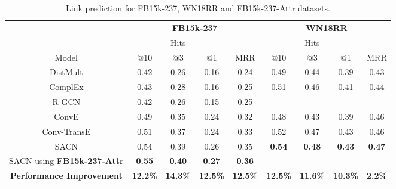 \documentclass[letterpaper]{article} \usepackage{aaai19}  \usepackage{times}  \usepackage{helvet}  \usepackage{courier}  \usepackage{url}  \usepackage{graphicx}  \usepackage{amsmath}
\begin{document}
\begin{table*}
\caption{Link prediction for FB15k-237, WN18RR and FB15k-237-Attr datasets.}
    \bigskip
    \label{tab:table3}
    \tabcolsep=0.32cm
    \centering
    \begin{tabular}{c|c|c|c|c|c|c|c|c}
        \hline
         & \multicolumn{4}{c|}{\textbf{FB15k-237}} & \multicolumn{4}{c}{\textbf{WN18RR}}\\
        \cline{2-9}
         & \multicolumn{3}{c|}{Hits} & \multicolumn{1}{c|}{}  & \multicolumn{3}{c|}{Hits}  & \multicolumn{1}{c}{} \\
        \cline{2-9}
        Model & @10 & @3 & @1 & MRR & @10 & @3 & @1 & MRR  \\
        \hline
        \hline
        DistMult \cite{yang2014distmult}  & 0.42 & 0.26 & 0.16& 0.24  & 0.49 & 0.44 & 0.39 & 0.43  \\
        \hline
        ComplEx \cite{trouillon2016complex}  & 0.43 & 0.28 & 0.16 & 0.25  & 0.51 & 0.46 & 0.41 & 0.44\\
        \hline
        R-GCN \cite{schlichtkrull2018modeling} & 0.42 & 0.26 & 0.15 & 0.25 & --- & ---  & --- & ---  \\
        \hline
        ConvE \cite{dettmers2017conve}  & 0.49 & 0.35 & 0.24 & 0.32   & 0.48 & 0.43 & 0.39 & 0.46 \\
        \hline
        \hline
Conv-TransE & 0.51 & 0.37 & 0.24 & 0.33  & 0.52 & 0.47 & 0.43 & 0.46\\
        \hline
SACN  & 0.54 & 0.39 & 0.26 & 0.35  & \textbf{0.54} & \textbf{0.48} & \textbf{0.43} & \textbf{0.47} \\
        \hline
SACN using \textbf{FB15k-237-Attr} & \textbf{0.55} & \textbf{0.40} & \textbf{0.27} & \textbf{0.36} & --- &--- & --- & --- \\
        \hline
        \hline
        \textbf{Performance Improvement}  & \textbf{12.2\%} & \textbf{14.3\%} & \textbf{12.5\%}& \textbf{12.5\%}   & \textbf{12.5\%} & \textbf{11.6\%} & \textbf{10.3\%} & \textbf{2.2\%} \\
        \hline
    \end{tabular}
\end{table*}
\end{document}
